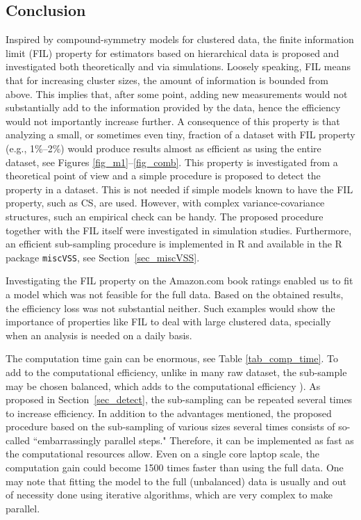 \documentclass[11pt,a5paper,twoside]{book}
\begin{document}
\subsection{Conclusion}
\label{cssec_conclusions}
Inspired by compound-symmetry models for clustered data, the finite information limit (FIL) property for estimators based on hierarchical data  is proposed and investigated both theoretically and via simulations. Loosely speaking, FIL means that for increasing cluster sizes, the amount of information is bounded from above. This implies that, after some point, adding new measurements would not substantially add to the information provided by the data, hence the efficiency would not importantly increase further. A consequence of this property is that analyzing a small, or sometimes even tiny, fraction of a dataset with FIL property (e.g., 1\%--2\%) would produce results  almost as efficient as using the entire dataset, see Figures \ref{fig_m1}--\ref{fig_comb}. This property is investigated from a theoretical point of view and a simple procedure is proposed to detect the property in a dataset. This is not needed if simple models known to have the FIL property, such as CS, are used. However, with complex variance-covariance structures, such an empirical check can be handy. 
The proposed procedure together with the FIL itself were investigated in simulation studies. Furthermore, an efficient sub-sampling procedure is implemented in \textsf{R} and available in the R package {\tt{miscVSS}}, see Section~\ref{sec_miscVSS}.

Investigating the FIL property on the Amazon.com book ratings enabled us to fit a model which was not feasible for the full data. Based on the obtained results, the efficiency loss was not substantial neither. Such examples would show the importance of properties like FIL to deal with large clustered data, specially when an analysis is needed on a daily basis.

The computation time gain can be enormous, see Table \ref{tab_comp_time}. To add to the computational  efficiency, unlike in many raw dataset, the sub-sample may be chosen balanced,  which adds to the computational efficiency \cite{Lisa2015_2}). As proposed in Section~\ref{sec_detect}, the sub-sampling can be repeated several times to increase efficiency. In addition to the  advantages mentioned, the proposed procedure based on the sub-sampling of various sizes several times consists of so-called ``embarrassingly parallel steps." Therefore, it can be implemented as fast as the computational resources allow. Even on a single core laptop scale, the computation gain could become 1500 times faster than using the full data. One may note that fitting the model to the full (unbalanced) data is usually and out of necessity done using iterative algorithms, which are very complex to make parallel.
\end{document}
